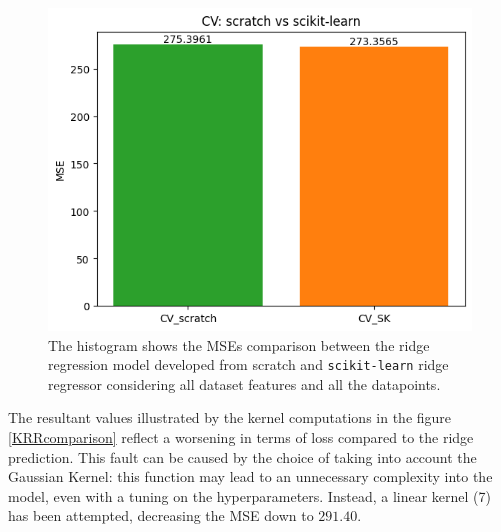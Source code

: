 \documentclass{article}
\begin{document}
    
\begin{figure}[H]
	\begin{adjustwidth}{0 cm}{}
		\begin{center}
			\includegraphics[scale= 0.53]{images/finalCV.png}
		\end{center}
	\end{adjustwidth}
	\caption{The histogram shows the MSEs comparison between the ridge regression model developed from scratch and \texttt{scikit-learn} ridge regressor considering all dataset features and all the datapoints.}
	\label{CVscrsk}
\end{figure}
The resultant values illustrated by the kernel computations in the figure \ref{KRRcomparison} reflect a worsening in terms of loss compared to the ridge prediction. This fault can be caused by the choice of taking into account the Gaussian Kernel: this function may lead to an unnecessary complexity into the model, even with a tuning on the hyperparameters. Instead, a linear kernel (7) has been attempted, decreasing the MSE down to $291.40$. 
\end{document}
